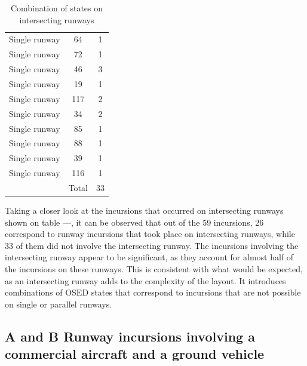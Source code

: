 \begin{table}[H]
\begin{tabular}{lcc}
Single runway                      & 64                      & 1                      \\ 
Single runway                      & 72                      & 1                      \\ 
Single runway                      & 46                      & 3                      \\ 
Single runway                      & 19                      & 1                      \\ 
Single runway                      & 117                     & 2                      \\ 
Single runway                      & 34                      & 2                      \\ 
Single runway                      & 85                      & 1                      \\ 
Single runway                      & 88                      & 1                      \\ 
Single runway                      & 39                      & 1                      \\ 
Single runway                      & 116                     & 1                      \\ 
                                   & Total                   & 33                     \\ 
\end{tabular}
\caption{Combination of states on intersecting runways}
\end{table}

Taking a closer look at the incursions that occurred on intersecting runways shown on table ---, it can be observed that out of the 59 incursions, 26 correspond to runway incursions that took place on intersecting runways, while 33 of them did not involve the intersecting runway. The incursions involving the intersecting runway appear to be significant, as they account for almost half of the incursions on these runways. This is consistent with what would be expected, as an intersecting runway adds to the complexity of the layout. It introduces combinations of OSED states that correspond to incursions that are not possible on single or parallel runways.  

\subsection{A and B Runway incursions involving a commercial aircraft and a ground vehicle}

